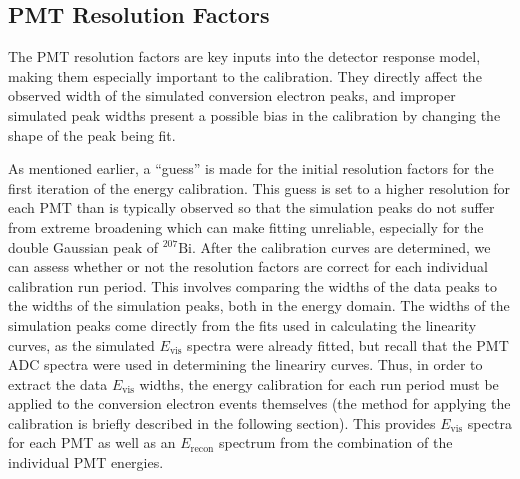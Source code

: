 \subsection{PMT Resolution Factors} \label{ssec:PMTresolution}

The PMT resolution factors are key inputs into the detector response model, making them especially
important to the calibration. They directly affect the observed width of the simulated conversion
electron peaks, and improper simulated peak widths present a possible bias in the calibration by changing
the shape of the peak being fit.

As mentioned earlier, a ``guess'' is made for the initial resolution factors for the first iteration
of the energy calibration. This guess is set to a higher resolution for each PMT than is typically observed so that
the simulation peaks do not suffer from extreme broadening which can make fitting unreliable, especially for
the double Gaussian peak of $^{207}\mathrm{Bi}$. After the calibration curves are determined, we can assess
whether or not the resolution factors are correct for each individual calibration run period.
This involves comparing the widths
of the data peaks to the widths of the simulation peaks, both in the energy domain. The widths of the simulation
peaks come directly from the fits used in calculating the linearity curves, as the simulated $E_{\mathrm{vis}}$
spectra were already fitted, but recall that the PMT ADC spectra were used in determining the lineariry curves. Thus, in order
to extract the data $E_{\mathrm{vis}}$ widths, the energy calibration for each run period must be applied
to the conversion electron events themselves (the method for applying the
calibration is briefly described in the following section). This provides $E_{\mathrm{vis}}$ spectra for each PMT as well as
an $E_{\mathrm{recon}}$ spectrum from the combination of the individual PMT energies.

